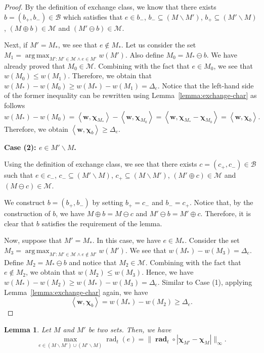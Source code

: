 \documentclass{article}
\newtheorem{lemma}{Lemma}
\newcommand{\M}{\mathcal M}
\newcommand{\B}{\mathcal B}
\newcommand{\del}{\backslash}
\DeclareMathOperator{\rad}{rad}
\DeclareMathOperator*{\argmax}{arg\,max}
\newcommand{\inn}[1]{\left\langle #1 \right\rangle}
\renewcommand{\vec}[1]{\boldsymbol{#1}}
\renewcommand{\odot}{\circ}
\begin{document}
\begin{spacing}{1.1}
\begin{proof}
By the definition of exchange class, we know that 
there exists $b=(b_+, b_-) \in \B$ which satisfies that
$e\in b_-$, $b_- \subseteq (M\del M') $, $b_+\subseteq (M' \del M)$, $(M\oplus b) \in \M$ and $(M'\ominus b) \in \M$.

Next, if $M'=M_*$, we see that $e\not \in M_*$.
Let us consider the set $M_1 = \argmax_{M': M'\in \M \wedge e\in M'} w(M')$.
Also define $M_0 = M_*\ominus b$. 
We have already proved that $M_0\in \M$.  
Combining with the fact that $e\in M_0$, we see that $w(M_0) \le w(M_1)$. 
Therefore, we obtain that
$w(M_*)-w(M_0) \ge w(M_*)-w(M_1) = \Delta_e$.
Notice that the left-hand side of the former inequality can be rewritten using Lemma~\ref{lemma:exchange-char} as follows
$$
w(M_*)-w(M_0) = \inn{\vec w, \vec \chi_{M_*}}-\inn{\vec w, \vec \chi_{M_0}} = \inn{\vec w, \vec \chi_{M_*}-\vec\chi_{M_0}}
= \inn{\vec w,\vec \chi_b}.
$$
Therefore, we obtain $\inn{\vec w,\vec \chi_b} \ge \Delta_e$.

\textbf{Case (2): $e\in M'\del M$.}

Using the definition of exchange class, we see that 
there exists $c=(c_+,c_-)\in \B$ such that 
$e\in c_-$, $c_-\subseteq (M'\del M)$, $c_+\subseteq (M\del M')$, $(M'\oplus c)\in \M$
and $(M\ominus c)\in \M$.

We construct $b=(b_+,b_-)$ by setting $b_+=c_-$ and $b_-=c_+$. 
Notice that, by the construction of $b$, we have $M\oplus b = M\ominus c$ and $M'\ominus b = M'\oplus c$.
Therefore, it is clear that $b$ satisfies the requirement of the lemma.


Now, suppose that $M'=M_*$. 
In this case, we have $e\in M_*$.
Consider the set $M_3 = \argmax_{M': M'\in \M \wedge e\not \in M'} w(M')$.
We see that $w(M_*)-w(M_3)=\Delta_e$.
Define $M_2 = M_* \ominus b$ and notice that  $M_2 \in \M$.
Combining with the fact that $e\not \in M_2$, we obtain that $w(M_2) \le w(M_3)$.
Hence, we have
$w(M_*)-w(M_2) \ge w(M_*)-w(M_3)=\Delta_e$.
Similar to Case (1), applying Lemma~\ref{lemma:exchange-char} again, we have
$$
\inn{\vec w,\vec \chi_b} = w(M_*)-w(M_2) \ge \Delta_e.
$$


\end{proof}

\begin{lemma}
\label{lemma:max}
Let $M$ and $M'$ be two sets. 
Then, we have 
$$ \max_{e \in (M\del M') \cup (M'\del M)} \rad_t(e) = \big\|\vec \rad_t \odot |\vec \chi_{M'} - \vec \chi_M| \big\|_\infty.$$
\end{lemma}


\end{spacing}
\end{document}
